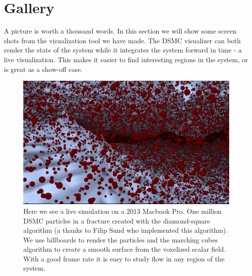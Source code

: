 \section{Gallery}
\label{sec:vis_gallery}
A picture is worth a thousand words. In this section we will show some screen shots from the visualization tool we have made. The DSMC visualizer can both render the state of the system while it integrates the system forward in time - a live visualization. This makes it easier to find interesting regions in the system, or is great as a show-off case.

\begin{figure}[htb]
\begin{center}
\includegraphics[width=\textwidth, trim=0cm 0cm 0cm 0cm, clip]{visualization/figures/marching_cubes_fracture.png}
\end{center}
\caption{Here we see a live simulation on a 2013 Macbook Pro. One million DSMC particles in a fracture created with the diamond-square algorithm (a thanks to Filip Sund who implemented this algorithm). We use billboards to render the particles and the marching cubes algorithm to create a smooth surface from the voxelized scalar field. With a good frame rate it is easy to study flow in any region of the system.}
\label{fig:vis_marching_cubes_1}
\end{figure}

